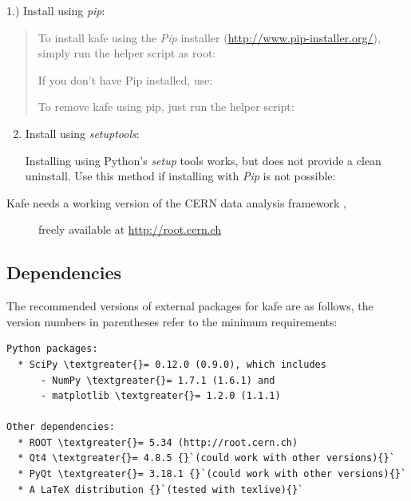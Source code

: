 \documentclass[a4paper,10pt,english]{sphinxmanual}
\begin{document}
1.) Install using \emph{pip}:
\begin{quote}

To install kafe using the \emph{Pip} installer
(\href{http://www.pip-installer.org/}{http://www.pip-installer.org/}), simply
run the helper script as root:
\begin{quote}

\end{quote}

If you don't have Pip installed, use:
\begin{quote}

\end{quote}

To remove kafe using pip, just run the helper script:
\begin{quote}

\end{quote}
\end{quote}
\begin{enumerate}
\setcounter{enumi}{1}
\item {} 
Install using \emph{setuptools}:

Installing using Python's \emph{setup} tools works, but does not
provide a clean uninstall. Use this method if installing
with \emph{Pip} is not possible:
\begin{quote}

\end{quote}

\end{enumerate}
\begin{description}
\item[{Kafe needs a working version of the CERN data analysis framework ,}] \leavevmode
freely available at  \href{http://root.cern.ch}{http://root.cern.ch}

\end{description}


\subsection{Dependencies}
\label{index:dependencies}
The recommended versions of external packages for kafe are as follows,
the version numbers in parentheses refer to the minimum requirements:

\begin{Verbatim}[commandchars=\\\{\}]
Python packages:
  * SciPy \textgreater{}= 0.12.0 (0.9.0), which includes
      - NumPy \textgreater{}= 1.7.1 (1.6.1) and
      - matplotlib \textgreater{}= 1.2.0 (1.1.1)

Other dependencies:
  * ROOT \textgreater{}= 5.34 (http://root.cern.ch)
  * Qt4 \textgreater{}= 4.8.5 {}`(could work with other versions){}`
  * PyQt \textgreater{}= 3.18.1 {}`(could work with other versions){}`
  * A LaTeX distribution {}`(tested with texlive){}`
\end{Verbatim}
\end{document}
